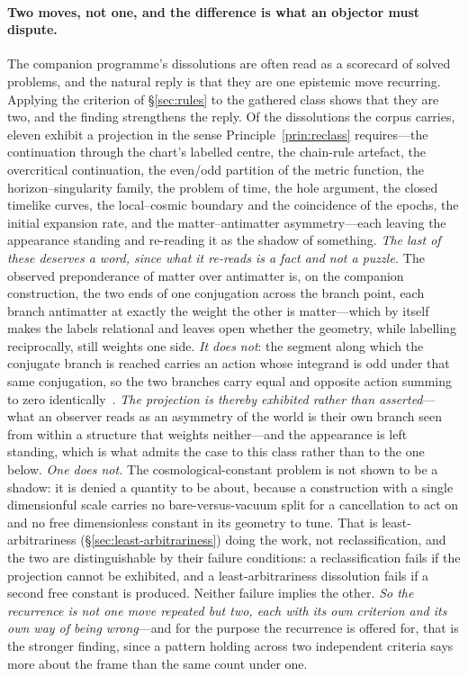 \documentclass[11pt,a4paper]{article}
\begin{document}
\paragraph{Two moves, not one, and the difference is what an objector must dispute.} The companion
programme's dissolutions are often read as a scorecard of solved problems, and the natural reply is that they
are one epistemic move recurring. Applying the criterion of \S\ref{sec:rules} to the gathered class shows that
they are two, and the finding strengthens the reply. Of the dissolutions the corpus
carries, eleven exhibit a projection in the sense Principle~\ref{prin:reclass} requires---the continuation through the
chart's labelled centre, the chain-rule artefact, the overcritical continuation, the even/odd partition of the
metric function, the horizon--singularity family, the problem of time, the hole argument, the closed timelike
curves, the local--cosmic boundary and the coincidence of the epochs, the initial expansion rate, and the matter--antimatter asymmetry---each leaving the appearance standing and
re-reading it as the shadow of something. \emph{The last of these deserves a word, since what it re-reads is a fact and not a puzzle.} The observed
preponderance of matter over antimatter is, on the companion construction, the two ends of one conjugation
across the branch point, each branch antimatter at exactly the weight the other is matter---which by itself
makes the labels relational and leaves open whether the geometry, while labelling reciprocally, still weights
one side. \emph{It does not}: the segment along which the conjugate branch is reached carries an action whose
integrand is odd under that same conjugation, so the two branches carry equal and opposite action summing to
zero identically~\cite{JanzenCRframework, JanzenRange}. \emph{The projection is thereby exhibited rather than
asserted}---what an observer reads as an asymmetry of the world is their own branch seen from within a
structure that weights neither---and the appearance is left standing, which is what admits the case to this
class rather than to the one below. \emph{One does not.} The cosmological-constant problem is
not shown to be a shadow: it is denied a quantity to be about, because a construction with a single dimensionful
scale carries no bare-versus-vacuum split for a cancellation to act on and no free dimensionless constant in its geometry to tune.
That is least-arbitrariness (\S\ref{sec:least-arbitrariness}) doing the work, not reclassification, and the two
are distinguishable by their failure conditions: a reclassification fails if the projection cannot be exhibited,
and a least-arbitrariness dissolution fails if a second free constant is produced. Neither failure implies the
other. \emph{So the recurrence is not one move repeated but two, each with its own criterion and its own way of
being wrong}---and for the purpose the recurrence is offered for, that is the stronger finding, since a pattern
holding across two independent criteria says more about the frame than the same count under one.
\end{document}
